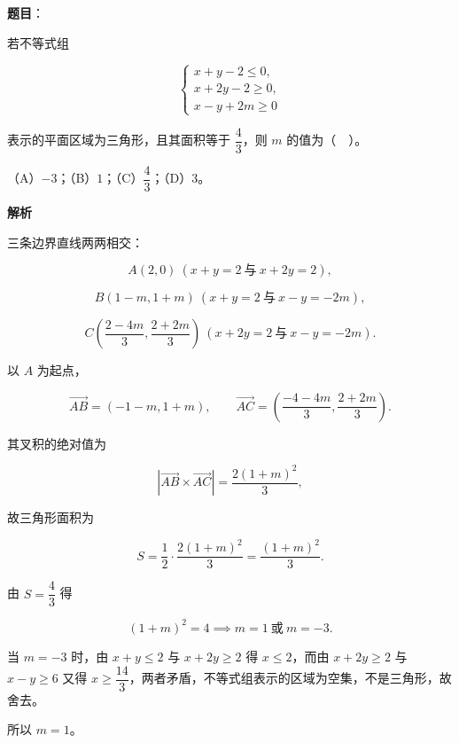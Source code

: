 \begin{answer}

\textbf{题目}：

若不等式组

\nopagebreak[4]
\[
\begin{cases}
x+y-2\le 0,\\
x+2y-2\ge 0,\\
x-y+2m\ge 0
\end{cases}
\]

表示的平面区域为三角形，且其面积等于 $\dfrac{4}{3}$，则 $m$ 的值为（　）。

（A）$-3$；（B）$1$；（C）$\dfrac{4}{3}$；（D）$3$。

\textbf{解析}

三条边界直线两两相交：

\nopagebreak[4]
\[
A(2,0)\ (x+y=2\ \text{与}\ x+2y=2),
\]

\nopagebreak[4]
\[
B(1-m,1+m)\ (x+y=2\ \text{与}\ x-y=-2m),
\]

\nopagebreak[4]
\[
C\left(\frac{2-4m}{3},\frac{2+2m}{3}\right)\ (x+2y=2\ \text{与}\ x-y=-2m).
\]

以 $A$ 为起点，

\nopagebreak[4]
\[
\overrightarrow{AB}=(-1-m,1+m),\qquad
\overrightarrow{AC}=\left(\frac{-4-4m}{3},\frac{2+2m}{3}\right).
\]

其叉积的绝对值为

\nopagebreak[4]
\[
\left|\overrightarrow{AB}\times\overrightarrow{AC}\right|
=\frac{2(1+m)^{2}}{3},
\]

故三角形面积为

\nopagebreak[4]
\[
S=\frac{1}{2}\cdot\frac{2(1+m)^{2}}{3}
=\frac{(1+m)^{2}}{3}.
\]

由 $S=\dfrac{4}{3}$ 得

\nopagebreak[4]
\[
(1+m)^{2}=4\implies m=1\ \text{或}\ m=-3.
\]

当 $m=-3$ 时，由 $x+y\le2$ 与 $x+2y\ge2$ 得 $x\le2$，而由 $x+2y\ge2$ 与 $x-y\ge6$ 又得 $x\ge\dfrac{14}{3}$，两者矛盾，不等式组表示的区域为空集，不是三角形，故舍去。

所以 $m=1$。


\end{answer}

